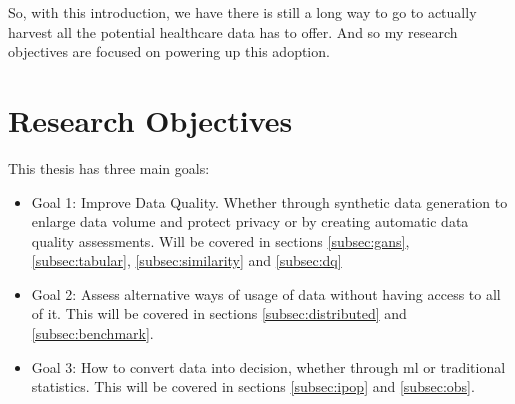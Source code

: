So, with this introduction, we have there is still a long way to go to actually harvest all the potential healthcare data has to offer. And so my research objectives are focused on powering up this adoption.
\section{Research Objectives}
This thesis has three main goals:
%









\begin{itemize}
    \item Goal 1: Improve Data Quality. Whether through synthetic data generation to enlarge data volume and protect privacy or by creating automatic data quality assessments. Will be covered in sections \ref{subsec:gans}, \ref{subsec:tabular}, \ref{subsec:similarity} and \ref{subsec:dq}

    \item Goal 2: Assess alternative ways of usage of data without having access to all of it. This will be covered in sections \ref{subsec:distributed} and \ref{subsec:benchmark}.

    \item Goal 3: How to convert data into decision, whether through \ac{ml} or traditional statistics. This will be covered in sections \ref{subsec:ipop} and \ref{subsec:obs}.
\end{itemize}